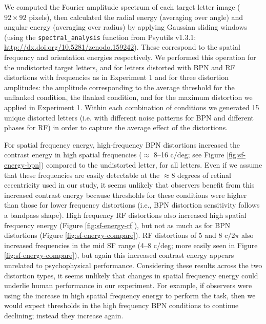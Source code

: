 \documentclass[doc, 11pt,a4paper,natbib]{apa6}\usepackage[]{graphicx}\usepackage[]{color}
\begin{document}
We computed the Fourier amplitude spectrum of each target letter image ($92 \times 92$ pixels),
then calculated the radial energy (averaging over angle) and angular energy (averaging over radius) by applying Gaussian sliding windows (using the
\texttt{spectral\_analysis}
function from Psyutils v1.3.1: \url{http://dx.doi.org/10.5281/zenodo.159242}).
These correspond to the spatial frequency and orientation energies respectively.
We performed this operation for the undistorted target letters, and for letters distorted with BPN and RF distortions with frequencies as in Experiment 1 and for three distortion amplitudes: the amplitude corresponding to the average threshold for the unflanked condition, the flanked condition, and for the maximum distortion we applied in Experiment 1.
Within each combination of conditions we generated 15 unique distorted letters (i.e. with different noise patterns for BPN and different phases for RF) in order to capture the average effect of the distortions.

For spatial frequency energy, high-frequency BPN distortions increased the contrast energy in high spatial frequencies ($\approx$ 8--16 c/deg; see Figure \ref{fig:sf-energy-bpn}) compared to the undistorted letter, for all letters.
Even if we assume that these frequencies are easily detectable at the $\approx 8$ degrees of retinal eccentricity used in our study, it seems unlikely that observers benefit from this increased contrast energy because thresholds for these conditions were higher than those for lower frequency distortions (i.e., BPN distortion sensitivity follows a bandpass shape).
High frequency RF distortions also increased high spatial frequency energy (Figure \ref{fig:sf-energy-rf}), but not as much as for BPN distortions (Figure \ref{fig:sf-energy-compare}).
RF distortions of 5 and 8 $\mathrm{c} / 2\pi$ also increased frequencies in the mid SF range (4--8 c/deg; more easily seen in Figure \ref{fig:sf-energy-compare}), but again this increased contrast energy appears unrelated to psychophysical performance.
Considering these results across the two distortion types, it seems unlikely that changes in spatial frequency energy could underlie human performance in our experiment.
For example, if observers were using the increase in high spatial frequency energy to perform the task, then we would expect thresholds in the high frequency BPN conditions to continue declining; instead they increase again.
\end{document}
